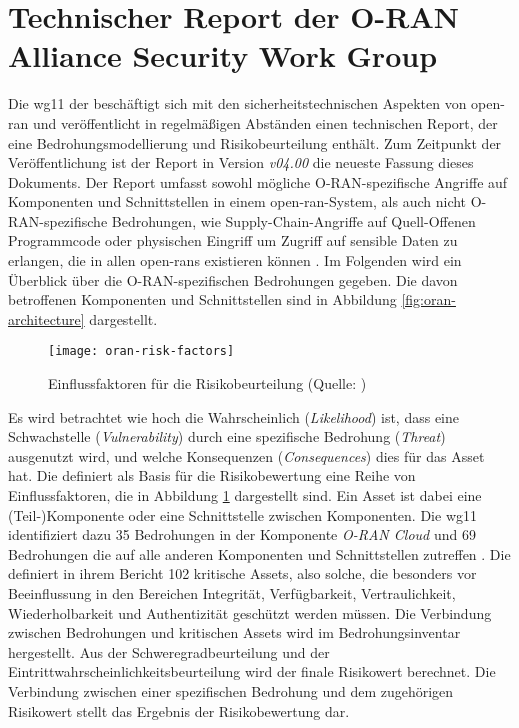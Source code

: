 \section{Technischer Report der O-RAN Alliance Security Work Group}
\label{sec:forschungsstand-wg11}
Die \gls{wg11} der \orana{} beschäftigt sich mit den sicherheitstechnischen Aspekten von \gls{open-ran} und veröffentlicht in regelmäßigen Abständen einen technischen Report, der eine Bedrohungsmodellierung und Risikobeurteilung enthält. Zum Zeitpunkt der Veröffentlichung ist der Report in Version \textit{\textsf{v04.00}} die neueste Fassung dieses Dokuments. Der Report umfasst sowohl mögliche O-RAN-spezifische Angriffe auf Komponenten und Schnittstellen in einem \gls{open-ran}-System, als auch nicht O-RAN-spezifische Bedrohungen, wie Supply-Chain-Angriffe auf Quell-Offenen Programmcode oder physischen Eingriff um Zugriff auf sensible Daten zu erlangen, die in allen \glspl{open-ran} existieren können \autocite{o-ranworkgroup11securityworkgroupORANSecurityThreat2024}. Im Folgenden wird ein Überblick über die O-RAN-spezifischen Bedrohungen gegeben. Die davon betroffenen Komponenten und Schnittstellen sind in Abbildung \ref{fig:oran-architecture} dargestellt.
\begin{figure}[H]
    \centering
    \texttt{[image: oran-risk-factors]}
    \caption{Einflussfaktoren für die Risikobeurteilung (Quelle: \autocite{o-ranworkgroup11securityworkgroupORANSecurityThreat2024})}
    \label{fig:oran-risk-factors}
\end{figure}
\par Es wird betrachtet wie hoch die Wahrscheinlich (\textit{Likelihood}) ist, dass eine Schwachstelle (\textit{Vulnerability}) durch eine spezifische Bedrohung (\textit{Threat}) ausgenutzt wird, und welche Konsequenzen (\textit{Consequences}) dies für das Asset hat. Die \orana{} definiert als Basis für die Risikobewertung eine Reihe von Einflussfaktoren, die in Abbildung \ref{fig:oran-risk-factors} dargestellt sind. Ein Asset ist dabei eine (Teil-)Komponente oder eine Schnittstelle zwischen Komponenten. Die \gls{wg11} identifiziert dazu 35 Bedrohungen in der Komponente \textit{O-RAN Cloud} und 69 Bedrohungen die auf alle anderen Komponenten und Schnittstellen zutreffen \autocite{o-ranworkgroup11securityworkgroupORANSecurityThreat2024}. Die \orana{} definiert in ihrem Bericht 102 kritische Assets, also solche, die besonders vor Beeinflussung in den Bereichen Integrität, Verfügbarkeit, Vertraulichkeit, Wiederholbarkeit und Authentizität geschützt werden müssen. Die Verbindung zwischen Bedrohungen und kritischen Assets wird im Bedrohungsinventar hergestellt. Aus der Schweregradbeurteilung und der Eintrittwahrscheinlichkeitsbeurteilung wird der finale Risikowert berechnet. Die Verbindung zwischen einer spezifischen Bedrohung und dem zugehörigen Risikowert stellt das Ergebnis der Risikobewertung dar.
